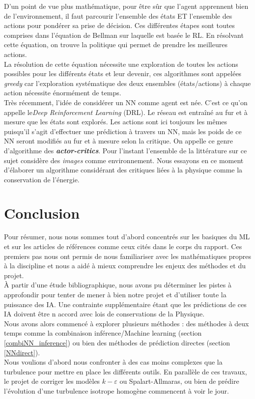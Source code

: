 \documentclass[a4paper,12pt]{article}
\newcommand{\keps}{$k-\varepsilon$}
\newcommand\bk{\color{black}}
\newcommand\navy{\color{navy}}
\numberwithin{equation}{section} %
\begin{document}
 \noindent D'un point de vue plus mathématique, pour être sûr que l'agent apprennent bien de l'environnement, il faut parcourir l'ensemble des états ET l'ensemble des actions pour pondérer sa prise de décision. Ces différentes étapes sont toutes comprises dans l'équation de Bellman sur laquelle est basée le RL. En résolvant cette équation, on trouve la politique qui permet de prendre les meilleures actions. \\
La résolution de cette équation nécessite une exploration de toutes les actions possibles pour les différents états et leur devenir, ces algorithmes sont appelées \textit{greedy} car l'exploration systématique des deux ensembles (états/actions) à chaque action nécessite énormément de temps. \\

\noindent Très récemment, l'idée de considérer un NN comme agent est née. C'est ce qu'on appelle le\textit{Deep Reinforcement Learning} (DRL). Le réseau est entraîné au fur et à mesure que les états sont explorés. Les actions sont ici toujours les mêmes puisqu'il s'agit d'effectuer une prédiction à travers un NN, mais les poids de ce NN seront modifiés au fur et à mesure selon la critique. On appelle ce genre d'algorithme des \textbf{\textit{actor-critics}}.
\noindent Pour l'instant l'ensemble de la littérature sur ce sujet considère des \textit{images} comme environnement. Nous essayons en ce moment d'élaborer un algorithme considérant des critiques liées à la physique comme la conservation de l'énergie.

\pagebreak

\navy \section{Conclusion} \bk
\noindent Pour résumer, nous nous sommes tout d'abord concentrés sur les basiques du ML et sur les articles de références comme ceux cités dans le corps du rapport. Ces premiers pas nous ont permis de nous familiariser avec les mathématiques propres à la discipline et nous a aidé à mieux comprendre les enjeux des méthodes et du projet.\\

\noindent À partir d'une étude bibliographique, nous avons pu déterminer les pistes à approfondir pour tenter de mener à bien notre projet et d'utiliser toute la puissance des IA. Une contrainte supplémentaire étant que les prédictions de ces IA doivent être n accord avec lois de conservations de la Physique.\\
Nous avons alors commencé à explorer plusieurs méthodes : des méthodes à deux temps comme la combinaison inférence/Machine learning (section \eqref{combiNN_inference}) ou bien des méthodes de prédiction directes (section \eqref{NNdirect}). \\
Nous voulions d'abord nous confronter à des cas moins complexes que la turbulence pour mettre en place les différents outils. En parallèle de ces travaux, le projet de corriger les modèles \keps $ $ ou Spalart-Allmaras, ou bien de prédire l'évolution d'une turbulence isotrope homogène commencent à voir le jour.\\
	
\end{document}
